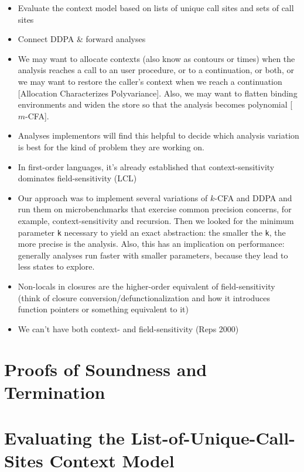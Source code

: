 \documentclass[12pt, oneside]{book}
\begin{document}
\begin{itemize}
  \item Evaluate the context model based on lists of unique call sites and sets of call sites
  \item Connect DDPA \& forward analyses
  \item We may want to allocate contexts (also know as contours or times) when the analysis reaches a call to an user procedure, or to a continuation, or both, or we may want to restore the caller’s context when we reach a continuation [Allocation Characterizes Polyvariance]. Also, we may want to flatten binding environments and widen the store so that the analysis becomes polynomial [\(m\)-CFA].
  \item Analyses implementors will find this helpful to decide which analysis variation is best for the kind of problem they are working on.
  \item In first-order languages, it’s already established that context-sensitivity dominates field-sensitivity (LCL)
  \item Our approach was to implement several variations of \(k\)-CFA and DDPA and run them on microbenchmarks that exercise common precision concerns, for example, context-sensitivity and recursion. Then we looked for the minimum parameter \texttt{k} necessary to yield an exact abstraction: the smaller the \texttt{k}, the more precise is the analysis. Also, this has an implication on performance: generally analyses run faster with smaller parameters, because they lead to less states to explore.
  \item Non-locals in closures are the higher-order equivalent of field-sensitivity (think of closure conversion/defunctionalization and how it introduces function pointers or something equivalent to it)
  \item We can’t have both context- and field-sensitivity (Reps 2000)
\end{itemize}

\section{Proofs of Soundness and Termination}
\label{section:proofs-of-soundness-and-termination}

\section{Evaluating the List-of-Unique-Call-Sites Context Model}
\label{section:evaluating-the-list-of-unique-call-sites-context-model}
\end{document}
